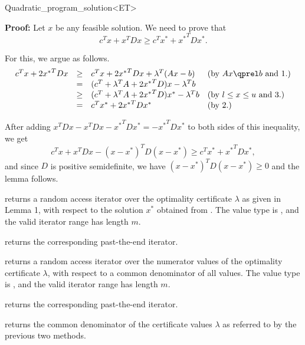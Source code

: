 \begin{ccRefClass}{Quadratic_program_solution<ET>}
\begin{ccAdvanced}
{\bf Proof:} Let $x$ be any feasible solution. We need to prove that
\[c^Tx + x^TDx \geq c^Tx^* + {x^*}^TDx^*.\]

For this, we argue as follows.
\[
\begin{array}{lcll}
c^Tx + 2{x^*}^TDx &\geq& c^Tx + 2{x^*}^TDx + \lambda^T(Ax-b) &  
\mbox{(by $Ax\qprel b$ and 1.)} \\
                  &=& (c^T + \lambda^T A + 2{x^*}^TD)x - \lambda^Tb \\
                  &\geq& (c^T + \lambda^T A + 2{x^*}^TD)x^* - \lambda^Tb &
\mbox{(by $l\leq x \leq u$ and 3.)} \\
                  &=& c^Tx^* + 2{x^*}^TDx^* &
\mbox{(by 2.)}
\end{array}
\]

After adding $x^TDx - x^TDx - {x^*}^TDx^* = -{x^*}^TDx^*$ to both sides of
this inequality, we get
\[
c^Tx + x^TDx - (x-x^*)^TD(x-x^*) \geq c^Tx^* + {x^*}^TDx^*,
\] 
and since $D$ is positive semidefinite, we have
$(x-x^*)^TD(x-x^*)\geq 0$ and the lemma follows.


{returns a random access iterator over the optimality certificate 
$\lambda$ as given in Lemma 1, with respect to the solution $x^*$ 
obtained from \ccVar{}. The value type
is , and the valid iterator range has length $m$.
\ccPrecond \ccVar{}}

{returns the corresponding past-the-end iterator.}

{returns a random access iterator over the numerator values
of the optimality certificate $\lambda$, with respect to a 
common denominator of all values. The value type
is , and the valid iterator range has length $m$.}

{returns the corresponding past-the-end iterator.}

{returns the common denominator of the certificate values 
$\lambda$ as referred to by the previous two methods.}

\ccExample
{}


\end{ccAdvanced}
\end{ccRefClass}
